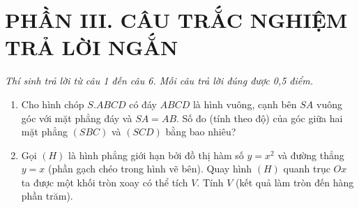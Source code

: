\documentclass[12pt,a4paper]{article}
\begin{document}
\vspace{0.4cm}
\section*{\large PHẦN III. CÂU TRẮC NGHIỆM TRẢ LỜI NGẮN}
\textit{Thí sinh trả lời từ câu 1 đến câu 6. Mỗi câu trả lời đúng được 0,5 điểm.}

\begin{enumerate}[label=\textbf{Câu \arabic*:}, leftmargin=*]

\item Cho hình chóp $S.ABCD$ có đáy $ABCD$ là hình vuông, cạnh bên $SA$ vuông góc với mặt phẳng đáy và $SA = AB$. Số đo (tính theo độ) của góc giữa hai mặt phẳng $(SBC)$ và $(SCD)$ bằng bao nhiêu?

\item \begin{minipage}[t]{0.55\linewidth}
Gọi $(H)$ là hình phẳng giới hạn bởi đồ thị hàm số $y = x^2$ và đường thẳng $y = x$ (phần gạch chéo trong hình vẽ bên). Quay hình $(H)$ quanh trục $Ox$ ta được một khối tròn xoay có thể tích $V$. Tính $V$ (kết quả làm tròn đến hàng phần trăm).
\end{minipage}\hfill
\begin{minipage}[t]{0.42\linewidth}
\vspace{-0.4\baselineskip}
\centering
{}
\end{minipage}


\end{enumerate}
\end{document}
